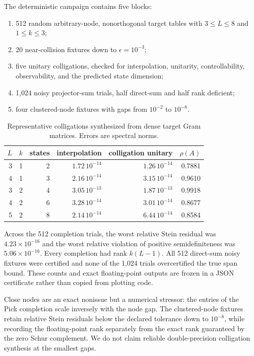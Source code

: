 \documentclass[11pt]{article}
\theoremstyle{definition}
\theoremstyle{remark}
\begin{document}
The deterministic campaign contains five blocks:
\begin{enumerate}
\item 512 random arbitrary-node, nonorthogonal target tables with
      $3\le L\le8$ and $1\le k\le3$;
\item 20 near-collision fixtures down to $\epsilon=10^{-3}$;
\item five unitary colligations, checked for interpolation, unitarity,
      controllability, observability, and the predicted state dimension;
\item 1,024 noisy projector-sum trials, half direct-sum and half rank deficient;
\item four clustered-node fixtures with gaps from $10^{-2}$ to $10^{-8}$.
\end{enumerate}

\begin{table}[t]
\centering
\caption{Representative colligations synthesized from dense target Gram
matrices.  Errors are spectral norms.}
\label{tab:colligations}
\small
\begin{tabular}{@{}rrrrrr@{}}
\toprule
$L$ & $k$ & states & interpolation & colligation unitary & $\rho(A)$\\
\midrule
3&1&2&$1.72\,10^{-14}$&$1.26\,10^{-14}$&0.7881\\
4&1&3&$2.16\,10^{-14}$&$3.15\,10^{-14}$&0.9610\\
3&2&4&$3.05\,10^{-13}$&$1.87\,10^{-13}$&0.9918\\
4&2&6&$3.28\,10^{-14}$&$3.01\,10^{-14}$&0.8677\\
5&2&8&$2.14\,10^{-14}$&$6.44\,10^{-14}$&0.8584\\
\bottomrule
\end{tabular}
\end{table}

Across the 512 completion trials, the worst relative Stein residual was
$4.23\times10^{-16}$ and the worst relative violation of positive
semidefiniteness was $5.06\times10^{-16}$.  Every completion had rank
$k(L-1)$.  All 512 direct-sum noisy fixtures were certified and none of the
1,024 trials overcertified the true span bound.  These counts and exact
floating-point outputs are frozen in a JSON certificate rather than copied
from plotting code.

Close nodes are an exact nonissue but a numerical stressor: the entries of
the Pick completion scale inversely with the node gap.  The clustered-node
fixtures retain relative Stein residuals below the declared tolerance down to
$10^{-8}$, while recording the floating-point rank separately from the exact
rank guaranteed by the zero Schur complement.  We do not claim reliable
double-precision colligation synthesis at the smallest gaps.
\end{document}
